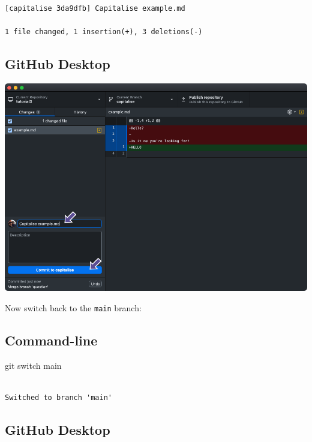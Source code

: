 \documentclass[
  letterpaper,
  DIV=11,
  numbers=noendperiod]{scrartcl}
\newenvironment{Shaded}{\begin{snugshade}}{\end{snugshade}}
\newcommand{\ControlFlowTok}[1]{\textcolor[rgb]{0.00,0.23,0.31}{#1}}
\newcommand{\NormalTok}[1]{\textcolor[rgb]{0.00,0.23,0.31}{#1}}
\begin{document}
\begin{verbatim}
[capitalise 3da9dfb] Capitalise example.md

1 file changed, 1 insertion(+), 3 deletions(-)
\end{verbatim}

\subsection{GitHub Desktop}

\includegraphics{images/image47.png}

Now switch back to the \texttt{main} branch:

\subsection{Command-line}

\begin{Shaded}
\begin{Highlighting}[]
\NormalTok{git }\ControlFlowTok{switch}\NormalTok{ main}
\end{Highlighting}
\end{Shaded}

\begin{verbatim}

Switched to branch 'main'
\end{verbatim}

\subsection{GitHub Desktop}
\end{document}
